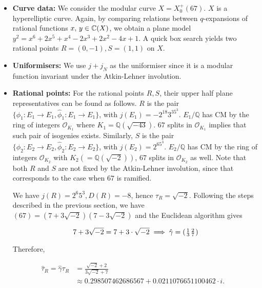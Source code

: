 \begin{itemize}

\item \textbf{Curve data:} We consider the modular curve $X = X_0^+(67)$. $X$ is a hyperelliptic curve. Again, by comparing relations between $q$-expansions of rational functions $x,\,y \in \mathbb{C}(X)$, we obtain a plane model $y^2 =  x^6 + 2x^5 + x^4 - 2x^3 + 2x^2 - 4x +1$. A quick box search yields two rational points $R = (0,-1),S = (1,1)$ on $X$.

\item \textbf{Uniformisers:} We use $j + j_N$ as the uniformiser since it is a modular function invariant under the Atkin-Lehner involution.

\item \textbf{Rational points:}  For the rational points $R,S$, their upper half plane representatives can be found as follows. $R$ is the pair $\{\phi_1: E_1 \rightarrow E_1, \hat{\phi}_1: E_1 \rightarrow E_1\}$, with $j(E_1) =   -2^{18}3^35^3$. $E_1/\mathbb{Q}$ has CM by the ring of integers $\mathcal{O}_{K_1}$ where $K_1 = \mathbb{Q}(\sqrt{-43})$. $67$ splits in $\mathcal{O}_{K_1}$ implies that such pair of isogenies exists. Similarly, $S$ is the pair $\{\phi_2: E_2 \rightarrow E_2, \hat{\phi}_2: E_2 \rightarrow E_2\}$, with $j(E_2) =2^65^3$.  $E_2/\mathbb{Q}$ has CM by the ring of integers $\mathcal{O}_{K_2}$ with $K_2 (= \mathbb{Q}(\sqrt{-2}))$, $67$ splits in $\mathcal{O}_{K_2}$ as well. Note that both $R$ and $S$ are not fixed by the Atkin-Lehner involution, since that corresponds to the case when $67$ is ramified.

We have $j(R) = 2^6 5^3, D(R) = -8$, hence $\tau_R = \sqrt{-2}$.
Following the steps described in the previous section, we have $(67) = (7+3\sqrt{-2})(7-3\sqrt{-2})$ and the Euclidean algorithm gives

\[
  7 + 3\sqrt{-2} = 7+ 3\cdot \sqrt{-2} \implies \hat{\gamma} = \begin{psmallmatrix}
    1       & 2 \\
    3       & 7
\end{psmallmatrix}
\]

Therefore, 

\begin{align*}
 \hat{\tau}_R = \hat{\gamma}\tau_R &= \frac{\sqrt{-2}+2}{3\sqrt{-2}+7} & \\ &\approx 0.298507462686567 + 0.0211076651100462\cdot i.
\end{align*}


\end{itemize}
